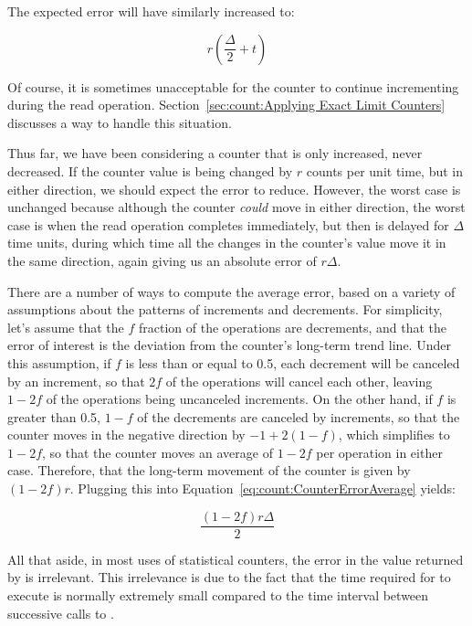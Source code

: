 {	The expected error will have similarly increased to:

	\begin{equation}
		r \left( \frac{\Delta}{2} + t \right)
	\end{equation}

	Of course, it is sometimes unacceptable for the counter to
	continue incrementing during the read operation.
	Section~\ref{sec:count:Applying Exact Limit Counters}
	discusses a way to handle this situation.

	Thus far, we have been considering a counter that is only
	increased, never decreased.
	If the counter value is being changed by $r$ counts per unit
	time, but in either direction, we should expect the error
	to reduce.
	However, the worst case is unchanged because although the
	counter \emph{could} move in either direction, the worst
	case is when the read operation completes immediately,
	but then is delayed for $\Delta$ time units, during which
	time all the changes in the counter's value move it in
	the same direction, again giving us an absolute error
	of $r \Delta$.

	There are a number of ways to compute the average error,
	based on a variety of assumptions about the patterns of
	increments and decrements.
	For simplicity, let's assume that the $f$ fraction of
	the operations are decrements, and that the error of interest
	is the deviation from the counter's long-term trend line.
	Under this assumption, if $f$ is less than or equal to 0.5,
	each decrement will be canceled by an increment, so that
	$2f$ of the operations will cancel each other, leaving
	$1-2f$ of the operations being uncanceled increments.
	On the other hand, if $f$ is greater than 0.5, $1-f$ of
	the decrements are canceled by increments, so that the
	counter moves in the negative direction by $-1+2\left(1-f\right)$,
	which simplifies to $1-2f$, so that the counter moves an average
	of $1-2f$ per operation in either case.
	Therefore, that the long-term
	movement of the counter is given by $\left( 1-2f \right) r$.
	Plugging this into
	Equation~\ref{eq:count:CounterErrorAverage} yields:

	\begin{equation}
		\frac{\left( 1 - 2 f \right) r \Delta}{2}
	\end{equation}

	All that aside, in most uses of statistical counters, the
	error in the value returned by  is
	irrelevant.
	This irrelevance is due to the fact that the time required
	for  to execute is normally extremely
	small compared to the time interval between successive
	calls to .
} \QuickQuizEnd

